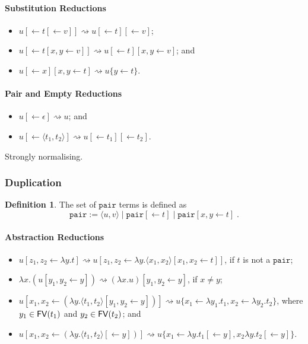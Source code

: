 \documentclass[11pt,a4paper]{article}
\theoremstyle{definition}
\newtheorem{definition}{Definition}
\theoremstyle{plain}
\theoremstyle{remark}
\begin{document}
\paragraph{Substitution Reductions}

\begin{itemize}
\item $u[\leftarrow t[\leftarrow v]]\rightsquigarrow u[\leftarrow t][\leftarrow v]$;
\item $u[\leftarrow t[x,y\leftarrow v]]\rightsquigarrow u[\leftarrow t][x,y\leftarrow v]$; and
\item $u[\leftarrow x][x,y\leftarrow t]\rightsquigarrow u\{y\leftarrow t\}$.
\end{itemize}

\paragraph{Pair and Empty Reductions}

\begin{itemize}
\item $u[\leftarrow\epsilon]\rightsquigarrow u$; and
\item $u[\leftarrow\langle t_1,t_2\rangle]\rightsquigarrow u[\leftarrow t_1][\leftarrow t_2]$.
\end{itemize}

Strongly normalising.

\subsubsection{Duplication}

\newcommand{\tpair}{{\mathtt{pair}}}

\begin{definition}
The set of $\tpair$ terms is defined as
\[\tpair:=\langle u,v\rangle\;|\;\tpair[\leftarrow t]\;|\;\tpair[x,y\leftarrow t]\;.\]
\end{definition}

\paragraph{Abstraction Reductions}

\begin{itemize}
\item $u[z_1,z_2\leftarrow\lambda y.t]\rightsquigarrow u[z_1,z_2\leftarrow\lambda y.\langle x_1,x_2\rangle[x_1,x_2\leftarrow t]]$, if $t$ is not a $\tpair$;
\item $\lambda x.(u[y_1,y_2\leftarrow y])\rightsquigarrow (\lambda x.u)[y_1,y_2\leftarrow y]$, if $x\neq y$;
\item $u[x_1,x_2\leftarrow(\lambda y.\langle t_1,t_2\rangle[y_1,y_2\leftarrow y])]\rightsquigarrow u\{x_1\leftarrow\lambda y_1.t_1,x_2\leftarrow\lambda y_2.t_2\}$, where $y_1\in{\mathop{\mathsf{FV}}}(t_1)$ and $y_2\in{\mathop{\mathsf{FV}}}(t_2)$; and
\item $u[x_1,x_2\leftarrow(\lambda y.\langle t_1,t_2\rangle[\leftarrow y])]\rightsquigarrow u\{x_1\leftarrow\lambda y.t_1[\leftarrow y],x_2\lambda y.t_2[\leftarrow y]\}$.
\end{itemize}
\end{document}
